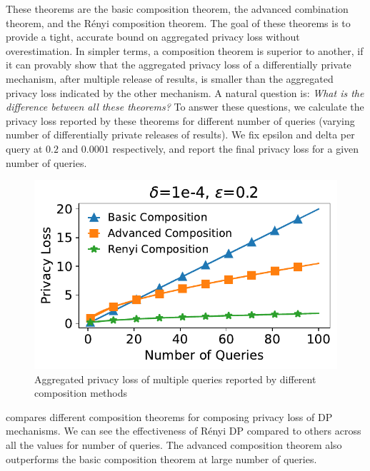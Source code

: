 These theorems are the basic composition theorem, the advanced combination theorem, and the R\'enyi composition theorem.
The goal of these theorems is to provide a tight, accurate bound on aggregated privacy loss without overestimation. 
In simpler terms, a composition theorem is superior to another, if it can provably show that the aggregated privacy loss of a differentially private mechanism, after multiple release of results, is smaller than the aggregated privacy loss indicated by the other mechanism.
A natural question is: \textit{What is the difference between all these theorems?}
To answer these questions, we calculate the privacy loss reported by these theorems for different number of queries (\ie varying number of differentially private releases of results).
We fix epsilon and delta per query at $0.2$ and $0.0001$ respectively, and report the final privacy loss for a given number of queries.
\begin{figure}[t]
  \centering
  \includegraphics[width=\columnwidth]{plots/composition_comparison.pdf}
  \caption{Aggregated privacy loss of multiple queries reported by different composition methods}
  \label{fig:composition-comparison}
\end{figure}

 compares different composition theorems for composing privacy loss of DP mechanisms.
We can see the effectiveness of R\'enyi DP compared to others across all the values for number of queries.
The advanced composition theorem also outperforms the basic composition theorem at large number of queries. 


